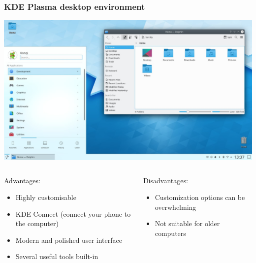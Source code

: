 \begin{frame}
	\frametitle{KDE Plasma desktop environment}
	
	\begin{center}
		\includegraphics[width=.7\linewidth]{../graphics/desktop_examples/kde.jpg}
	\end{center}%

	\vspace{-\baselineskip}
	
	\begin{columns}
		\begin{column}[t]{.7\linewidth}
			\begin{exampleblock}{Advantages:}
				\begin{itemize}
					\item Highly customisable
					\item KDE Connect (connect your phone to the computer)
					\item Modern and polished user interface
					\item Several useful tools built-in
				\end{itemize}
			\end{exampleblock}
		\end{column}
		\hfill
		\begin{column}[t]{.28\linewidth}
			\begin{alertblock}{Disadvantages:}
				\begin{itemize}
					\item Customization options can be overwhelming
					\item Not suitable for older computers
				\end{itemize}
			\end{alertblock}
		\end{column}
	\end{columns}
	\hfill
\end{frame}

